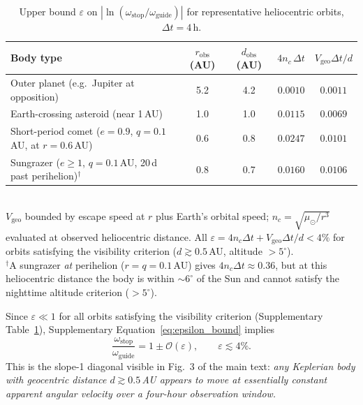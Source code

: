 \documentclass[11pt,a4paper]{article}
\begin{document}
\begin{table}[h]
  \centering
  \caption{Upper bound $\varepsilon$ on $|\ln(\omega_\mathrm{stop}/\omega_\mathrm{guide})|$
    for representative heliocentric orbits, $\Delta t = 4\,\mathrm{h}$.}
  \label{tab:epsilon}
  \small
  \begin{tabular}{@{}p{5.5cm}cccc@{}}
    \toprule
    Body type & $r_\mathrm{obs}$ (AU) & $d_\mathrm{obs}$ (AU) & $4n_c\,\Delta t$ & $V_\mathrm{geo}\Delta t/d$ \\
    \midrule
    Outer planet (e.g.\ Jupiter at opposition) & 5.2  & 4.2  & $0.0010$ & $0.0011$ \\
    Earth-crossing asteroid (near 1\,AU)       & 1.0  & 1.0  & $0.0115$ & $0.0069$ \\
    Short-period comet ($e\!=\!0.9$, $q\!=\!0.1$\,AU, at $r\!=\!0.6$\,AU) & 0.6  & 0.8  & $0.0247$ & $0.0101$ \\
    Sungrazer ($e\!\ge\!1$, $q\!=\!0.1$\,AU, 20\,d past perihelion)$^\dagger$ & 0.8  & 0.7  & $0.0160$ & $0.0106$ \\
    \bottomrule
  \end{tabular}
  \smallskip\\
  {\footnotesize $V_\mathrm{geo}$ bounded by escape speed at $r$ plus Earth's orbital speed;
  $n_c = \sqrt{\mu_\odot/r^3}$ evaluated at observed heliocentric distance.
  All $\varepsilon = 4n_c\Delta t + V_\mathrm{geo}\Delta t/d < 4\%$ for orbits satisfying
  the visibility criterion ($d \gtrsim 0.5$\,AU, altitude $> 5^\circ$). \\
  $^\dagger$A sungrazer \emph{at} perihelion ($r = q = 0.1$\,AU) gives $4n_c\Delta t\approx 0.36$,
  but at this heliocentric distance the body is within ${\sim}6^\circ$ of the Sun
  and cannot satisfy the nighttime altitude criterion ($> 5^\circ$).}
\end{table}

\noindent Since $\varepsilon \ll 1$ for all orbits satisfying the visibility
criterion (Supplementary Table~\ref{tab:epsilon}), Supplementary Equation~\eqref{eq:epsilon_bound} implies
\begin{equation}
  \frac{\omega_\mathrm{stop}}{\omega_\mathrm{guide}} = 1 \pm \mathcal{O}(\varepsilon),
  \qquad \varepsilon \lesssim 4\%.
\end{equation}
This is the slope-1 diagonal visible in Fig.~3 of the main text: \textit{any Keplerian body with
geocentric distance $d \gtrsim 0.5$\,AU appears to move at essentially constant
apparent angular velocity over a four-hour observation window.}
\end{document}
